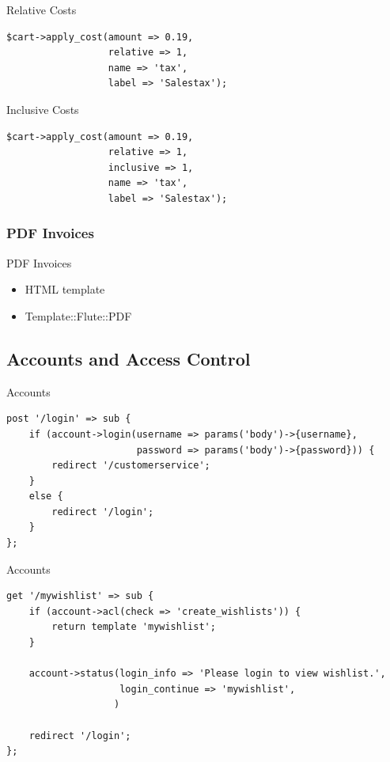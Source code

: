 \begin{frame}[fragile]{Relative Costs}
\begin{lstlisting}
$cart->apply_cost(amount => 0.19, 
                  relative => 1, 
                  name => 'tax', 
                  label => 'Salestax');
\end{lstlisting}
\end{frame}

\begin{frame}[fragile]{Inclusive Costs}
\begin{lstlisting}
$cart->apply_cost(amount => 0.19, 
                  relative => 1, 
                  inclusive => 1, 
                  name => 'tax', 
                  label => 'Salestax');
\end{lstlisting}
\end{frame}

\subsubsection{PDF Invoices}
\begin{frame}{PDF Invoices}
\begin{itemize}
\item HTML template
\item Template::Flute::PDF
\end{itemize}
\end{frame}

\subsection{Accounts and Access Control}

\begin{frame}[fragile]{Accounts}
\begin{lstlisting}
post '/login' => sub {
    if (account->login(username => params('body')->{username},
                       password => params('body')->{password})) {
        redirect '/customerservice';
    }
    else {
        redirect '/login';
    }
};
\end{lstlisting}
\end{frame}

\begin{frame}[fragile]{Accounts}
\begin{lstlisting}
get '/mywishlist' => sub {
    if (account->acl(check => 'create_wishlists')) {
        return template 'mywishlist';
    }

    account->status(login_info => 'Please login to view wishlist.',
                    login_continue => 'mywishlist',
                   )

    redirect '/login';
};
\end{lstlisting}
\end{frame}

